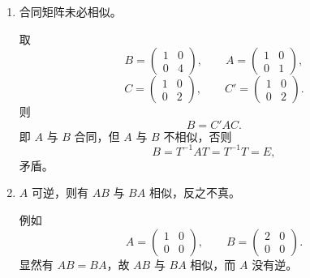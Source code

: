 \begin{enumerate}
例如
\[
 A=\begin{pmatrix}1&0\\0&2\end{pmatrix},\qquad
 B=\begin{pmatrix}1&-\frac12\\0&2\end{pmatrix},
\]
\[
 T=\begin{pmatrix}2&1\\0&3\end{pmatrix},\qquad
 T^{-1}=\begin{pmatrix}\frac12&-\frac16\\0&\frac13\end{pmatrix}.
\]
那么
\[
 B=T^{-1}AT,
\]
即 $A$ 与 $B$ 相似。但 $A$ 与 $B$ 不合同，否则
\[
 B=C'AC.
\]
令
\[
 C'=\begin{pmatrix}a&b\\c&d\end{pmatrix},\qquad
 C=\begin{pmatrix}a&c\\b&d\end{pmatrix},
\]
则
\[
 C'AC=\begin{pmatrix}
 a^2+2b^2&ac+2bd\\
 ac+2bd&c^2+2d^2
 \end{pmatrix}.
\]
比较非对角元，须有
\[
 ac+2bd=-\frac12,
\qquad
 ac+2bd=0,
\]
矛盾。

\item 合同矩阵未必相似。

取
\[
 B=\begin{pmatrix}1&0\\0&4\end{pmatrix},\qquad
 A=\begin{pmatrix}1&0\\0&1\end{pmatrix},
\]
\[
 C=\begin{pmatrix}1&0\\0&2\end{pmatrix},\qquad
 C'=\begin{pmatrix}1&0\\0&2\end{pmatrix}.
\]
则
\[
 B=C'AC.
\]
即 $A$ 与 $B$ 合同，但 $A$ 与 $B$ 不相似，否则
\[
 B=T^{-1}AT=T^{-1}T=E,
\]
矛盾。

\item $A$ 可逆，则有 $AB$ 与 $BA$ 相似，反之不真。

例如
\[
 A=\begin{pmatrix}1&0\\0&0\end{pmatrix},\qquad
 B=\begin{pmatrix}2&0\\0&0\end{pmatrix}.
\]
显然有 $AB=BA$，故 $AB$ 与 $BA$ 相似，而 $A$ 没有逆。


\end{enumerate}
